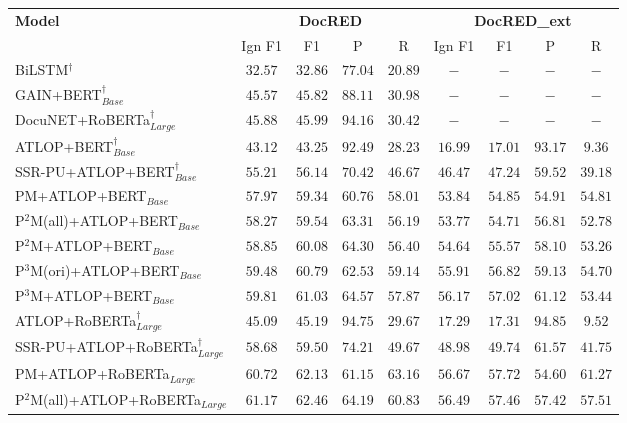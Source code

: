 \documentclass[letterpaper]{article}
\begin{document}
\begin{table}[!ht]
\centering
\begin{tabular}{lcccc|cccc}
\toprule
\multirow{2}{*}{\textbf{Model}} & \multicolumn{4}{c}{\textbf{DocRED}} & \multicolumn{4}{c}{\textbf{DocRED\_ext}} \\
\cmidrule(l){2-9} & Ign F1 & F1 & P & R & Ign F1 & F1 & P & R \\ \midrule
BiLSTM$^{\dagger}$ & $32.57$ & $32.86$ & $77.04$ & $20.89$ & $-$ & $-$ & $-$ & $-$ \\
GAIN+BERT$_{Base}^{\dagger}$ & $45.57$ & $45.82$ & $88.11$ & $30.98$ & $-$ & $-$ & $-$ & $-$ \\
DocuNET+RoBERTa$_{Large}^{\dagger}$ & $45.88$ & $45.99$ & $94.16$ & $30.42$ & $-$ & $-$ & $-$ & $-$ \\
\midrule
ATLOP+BERT$_{Base}^{\dagger}$ & $43.12$ & $43.25$ & $\mathbf{92.49}$ & $28.23$ & $16.99$ & $17.01$ & $\mathbf{93.17}$ & $9.36$ \\
SSR-PU+ATLOP+BERT$_{Base}^{\dagger}$ & $55.21$ & $56.14$ & $70.42$ & $46.67$ & $46.47$ & $47.24$ & $59.52$ & $39.18$ \\
PM+ATLOP+BERT$_{Base}$ & $57.97$ & $59.34$ & $60.76$ & $58.01$ & $53.84$ & $54.85$ & $54.91$ & $\mathbf{54.81}$ \\
P$^{2}$M(all)+ATLOP+BERT$_{Base}$ & $58.27$ & $59.54$ & $63.31$ & $56.19$ & $53.77$ & $54.71$ & $56.81$ & $52.78$ \\
P$^{2}$M+ATLOP+BERT$_{Base}$ & $58.85$ & $60.08$ & $64.30$ & $56.40$ & $54.64$ & $55.57$ & $58.10$ & $53.26$ \\
P$^{3}$M(ori)+ATLOP+BERT$_{Base}$ & $59.48$ & $60.79$ & $62.53$ & $\mathbf{59.14}$ & $55.91$ & $56.82$ & $59.13$ & $54.70$ \\
P$^{3}$M+ATLOP+BERT$_{Base}$ & $\mathbf{59.81}$ & $\mathbf{61.03}$ & $64.57$ & $57.87$ & $\mathbf{56.17}$ & $\mathbf{57.02}$ & $61.12$ & $53.44$ \\
\midrule
ATLOP+RoBERTa$_{Large}^{\dagger}$ & $45.09$ & $45.19$ & $\mathbf{94.75}$ & $29.67$ & $17.29$ & $17.31$ & $\mathbf{94.85}$ & $9.52$ \\
SSR-PU+ATLOP+RoBERTa$_{Large}^{\dagger}$ & $58.68$ & $59.50$ & $74.21$ & $49.67$ & $48.98$ & $49.74$ & $61.57$ & $41.75$ \\
PM+ATLOP+RoBERTa$_{Large}$ & $60.72$ & $62.13$ & $61.15$ & $63.16$ & $56.67$ & $57.72$ & $54.60$ & $\mathbf{61.27}$ \\
P$^{2}$M(all)+ATLOP+RoBERTa$_{Large}$ & $61.17$ & $62.46$ & $64.19$ & $60.83$ & $56.49$ & $57.46$ & $57.42$ & $57.51$ \\

\end{tabular}
\end{table}
\end{document}

